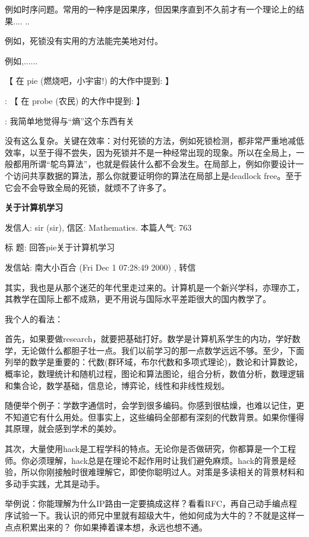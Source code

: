 例如时序问题。常用的一种序是因果序，但因果序直到不久前才有一个理论上的结果....
..

例如，死锁没有实用的方法能完美地对付。

例如,......

【 在 pie (燃烧吧，小宇宙!) 的大作中提到: 】

: 【 在 probe (农民) 的大作中提到: 】

: 我简单地觉得与“熵”这个东西有关

没有这么复杂。关键在效率：对付死锁的方法，例如死锁检测，都非常严重地减低效率，以至于得不尝失，因为死锁并不是一种经常出现的现象。所以在全局上，一般都用所谓“鸵鸟算法”，也就是假装什么都不会发生。在局部上，例如你要设计一个访问共享数据的算法，那么你就要证明你的算法在局部上是deadlock free。至于它会不会导致全局的死锁，就烦不了许多了。





\textbf{关于计算机学习}

发信人: sir (sir), 信区: Mathematics. 本篇人气: 763

标  题: 回答pie关于计算机学习

发信站: 南大小百合 (Fri Dec  1 07:28:49 2000) , 转信

其实，我也是从那个迷茫的年代里走过来的。计算机是一个新兴学科，亦理亦工，其教学在国际上都不成熟，更不用说与国际水平差距很大的国内教学了。

我个人的看法：

首先，如果要做research，就要把基础打好。数学是计算机系学生的内功，学好数学，无论做什么都胆子壮一点。我们以前学习的那一点数学远远不够。至少，下面列举的数学是重要的：代数(群环域，布尔代数和多项式理论)，数论和计算数论，概率论，数理统计和随机过程，图论和算法图论，组合分析，数值分析，数理逻辑和集合论，数学基础，信息论，博弈论，线性和非线性规划。

随便举个例子：学数字通信时，会学到很多编码。你感到很枯燥，也难以记住，更不知道它有什么用处。但事实上，这些编码全部都有深刻的代数背景。如果你懂得其原理，就会感到学术的美妙。

其次，大量使用hack是工程学科的特点。无论你是否做研究，你都算是一个工程师。你必须理解，hack总是在理论不起作用时让我们避免麻烦。hack的背景是经验，所以你刚接触时很难理解它，即使你聪明过人。对策是多读相关的背景材料和多动手实践，尤其是动手。

举例说：你能理解为什么IP路由一定要搞成这样？看看RFC，再自己动手编点程序试验一下。我认识的师兄中里就有超级大牛，他如何成为大牛的？不就是这样一点点积累出来的？
你如果捧着课本想，永远也想不通。

